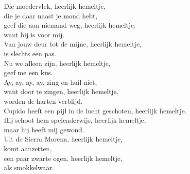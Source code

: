 \clearpage
\begin{translation}
Die moedervlek, heerlijk hemeltje,\\
die je daar naast je mond hebt,\\
geef die aan niemand weg, heerlijk hemeltje,\\
want hij is voor mij.\\
\vspace{1em}
Van jouw deur tot de mijne, heerlijk hemeltje,\\
is slechts een pas.\\
Nu we alleen zijn, heerlijk hemeltje,\\
geef me een kus.\\
\vspace{1em}
Ay, ay, ay, ay, zing en huil niet,\\
want door te zingen, heerlijk hemeltje,\\
worden de harten verblijd.\\
\vspace{1em}
Cupido heeft een pijl in de lucht geschoten, heerlijk hemeltje.\\
Hij schoot hem spelenderwijs, heerlijk hemeltje,\\
maar hij heeft mij gewond.\\
\vspace{1em}
Uit de Sierra Morena, heerlijk hemeltje,\\
komt aanzetten,\\
een paar zwarte ogen, heerlijk hemeltje,\\
als smokkelwaar.\\
\end{translation}